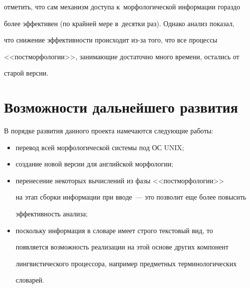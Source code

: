 отметить, что сам механизм доступа к~морфологической информации гораздо

более эффективен (по крайней мере в~десятки раз). Однако анализ показал,

что снижение эффективности происходит из-за того, что все процессы

<<постморфологии>>, занимающие достаточно много времени, остались от

старой версии.



\vspace*{-2pt}



\section{Возможности дальнейшего развития}



\vspace*{-2pt}



    В порядке развития данного проекта намечаются следующие работы:

    \begin{itemize}

\item перевод всей морфологической системы под ОС UNIX;

    \item создание новой версии для английской морфологии;

    \item перенесение некоторых вычислений из фазы <<постморфологии>>

на этап сборки информации при вводе~--- это позволит еще более повысить

эффективность анализа;

    \item поскольку информация в словаре имеет строго текстовый вид, то

появляется возможность реализации на этой основе других компонент

лингвистического процессора, например предметных терминологических

словарей.

    \end{itemize}



\vspace*{-2pt}



